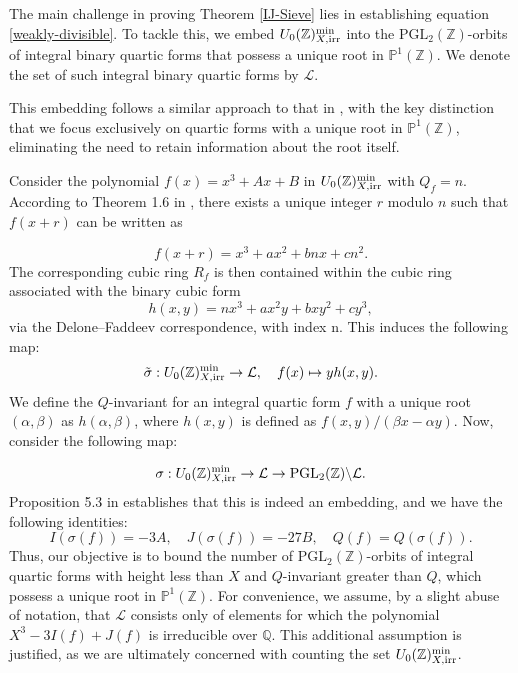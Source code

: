 \documentclass{article}
\def\irr{{\rm irr}}
\def\Q{{\mathbb Q}}
\def\Q{{\mathbb Q}}
\begin{document}
The main challenge in proving Theorem \ref{IJ-Sieve} lies in establishing equation \eqref{weakly-divisible}. To tackle this, we embed $U_0(\mathbb{Z})_{X,\irr}^{\min}$ into the $\text{PGL}_2(\mathbb{Z})$-orbits of integral binary quartic forms that possess a unique root in $\mathbb{P}^1(\mathbb{Z})$. We denote the set of such integral binary quartic forms by $\mathcal{L}$.

This embedding follows a similar approach to that in \cite{consuctor}, with the key distinction that we focus exclusively on quartic forms with a unique root in $\mathbb{P}^1(\mathbb{Z})$, eliminating the need to retain information about the root itself.

Consider the polynomial $f(x) = x^3 + Ax + B$ in $U_0(\mathbb{Z})_{X, \irr}^{\min}$ with $Q_f = n$. According to Theorem 1.6 in \cite{consuctor}, there exists a unique integer $r$ modulo $n$ such that $f(x + r)$ can be written as

\begin{equation*}
f(x + r) = x^3 + ax^2 + bnx + cn^2.
\end{equation*}
The corresponding cubic ring $R_f$ is then contained within the cubic ring associated with the binary cubic form
\begin{equation*}
h(x, y) = nx^3 + ax^2y + bxy^2 + cy^3,
\end{equation*}
via the Delone–Faddeev correspondence, with index n. This induces the following map:
\begin{equation*}
\tilde{\sigma}: U_0(\mathbb{Z})_{X,\irr}^{\min} \rightarrow \mathcal{L},
\quad f(x) \mapsto yh(x, y).
\end{equation*}
We define the $Q$-invariant for an integral quartic form $f$ with a unique root $(\alpha, \beta)$ as $h(\alpha, \beta)$, where $h(x, y)$ is defined as $f(x, y)/(\beta x - \alpha y)$. Now, consider the following map:

\begin{equation*}
\sigma: U_0(\mathbb{Z})_{X,\irr}^{\min} \rightarrow \mathcal{L} \rightarrow \text{PGL}_2(\mathbb{Z}) \backslash \mathcal{L}.
\end{equation*}
Proposition 5.3 in \cite{consuctor} establishes that this is indeed an embedding, and we have the following identities:
\begin{equation*}
I(\sigma(f)) = -3A, \quad J(\sigma(f)) = -27B, \quad Q(f) = Q(\sigma(f)).
\end{equation*}
Thus, our objective is to bound the number of $\text{PGL}_2(\mathbb{Z})$-orbits of integral quartic forms with height less than $X$ and $Q$-invariant greater than $Q$, which possess a unique root in $\mathbb{P}^1(\mathbb{Z})$. For convenience, we assume, by a slight abuse of notation, that $\mathcal{L}$ consists only of elements for which the polynomial $X^3 - 3I(f) + J(f)$ is irreducible over $\Q$. This additional assumption is justified, as we are ultimately concerned with counting the set $U_0(\mathbb{Z})_{X,\irr}^{\min}$.
\end{document}
